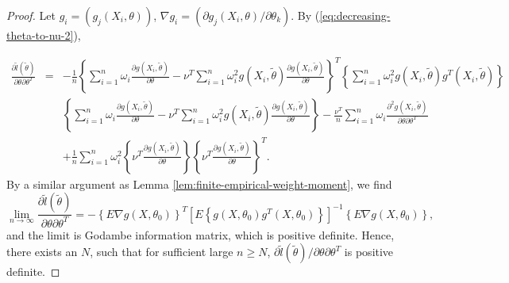 \begin{proof}
Let $g_{i}=\left(g_{j}\left(X_{i},\theta\right)\right)$, $\nabla g_{i}=\left({\partial g_{j}\left(X_{i},\theta\right)} / {\partial\theta_{k}}\right)$. By (\ref{eq:decreasing-theta-to-nu-2}), 

\begin{eqnarray*}
\frac{\partial\tilde{l}\left(\tilde{\theta}\right)}{\partial\theta\partial\theta^{T}}&=&-\frac{1}{n}\left\{ \sum_{i=1}^{n}\omega_{i}\frac{\partial g\left(X_{i},\tilde{\theta}\right)}{\partial\theta}-\nu^{T}\sum_{i=1}^{n}\omega_{i}^{2}g\left(X_{i},\tilde{\theta}\right)\frac{\partial g\left(X_{i},\tilde{\theta}\right)}{\partial\theta}\right\} ^{T}\left\{ \sum_{i=1}^{n}\omega_{i}^{2}g\left(X_{i},\tilde{\theta}\right)g^{T}\left(X_{i},\tilde{\theta}\right)\right\} \\&&\left\{ \sum_{i=1}^{n}\omega_{i}\frac{\partial g\left(X_{i},\tilde{\theta}\right)}{\partial\theta}-\nu^{T}\sum_{i=1}^{n}\omega_{i}^{2}g\left(X_{i},\tilde{\theta}\right)\frac{\partial g\left(X_{i},\tilde{\theta}\right)}{\partial\theta}\right\} -\frac{\nu^{T}}{n}\sum_{i=1}^{n}\omega_{i}\frac{\partial^{2}g\left(X_{i},\tilde{\theta}\right)}{\partial\theta\partial\theta^{T}}\\&&+\frac{1}{n}\sum_{i=1}^{n}\omega_{i}^{2}\left\{ \nu^{T}\frac{\partial g\left(X_{i},\tilde{\theta}\right)}{\partial\theta}\right\} \left\{ \nu^{T}\frac{\partial g\left(X_{i},\tilde{\theta}\right)}{\partial\theta}\right\} ^{T}.
\end{eqnarray*}
By a similar argument as Lemma \ref{lem:finite-empirical-weight-moment}, we find 
\[
   \lim_{n\rightarrow\infty} \frac{\partial\tilde{l}\left(\tilde{\theta}\right)}{\partial\theta\partial\theta^{T}} = -\left\{E\nabla g (X,\theta_0) \right\}^T \left[E\left\{g (X,\theta_0)g^T (X,\theta_0)\right\}\right]^{-1} \left\{E\nabla g (X,\theta_0)\right\},
\]
and the limit is Godambe information matrix, which is positive definite. Hence, there exists an $N$, such that for sufficient large $n\ge N$, ${\partial\tilde{l}\left(\tilde{\theta}\right)} / {\partial\theta\partial\theta^{T}}$ is positive definite.


\end{proof}
